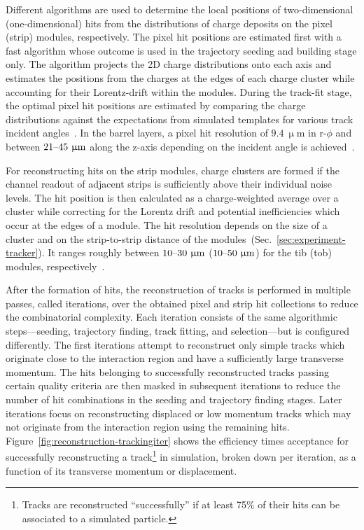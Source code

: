 Different algorithms are used to determine the local positions of two-dimensional (one-dimensional) hits from the distributions of charge deposits on the pixel (strip) modules, respectively. The pixel hit positions are estimated first with a fast algorithm whose outcome is used in the trajectory seeding and building stage only. The algorithm projects the 2D charge distributions onto each axis and estimates the positions from the charges at the edges of each charge cluster while accounting for their Lorentz-drift within the modules. During the track-fit stage, the optimal pixel hit positions are estimated by comparing the charge distributions against the expectations from simulated templates for various track incident angles~\cite{Swartz:2007zz}. In the barrel layers, a pixel hit resolution of $9.4~\upmu\mathrm{m}$ in $\mathrm{r}\mbox{-}\phi$ and between $21\text{--}45~\upmu\mathrm{m}$ along the z-axis depending on the incident angle is achieved~\cite{Chatrchyan:2014fea}. 

For reconstructing hits on the strip modules, charge clusters are formed if the channel readout of adjacent strips is sufficiently above their individual noise levels. The hit position is then calculated as a charge-weighted average over a cluster while correcting for the Lorentz drift and potential inefficiencies which occur at the edges of a module. The hit resolution depends on the size of a cluster and on the strip-to-strip distance of the modules~(Sec.~\ref{sec:experiment-tracker}). It ranges roughly between $10\text{--}30~\upmu\mathrm{m}$ ($10\text{--}50~\upmu\mathrm{m}$) for the \gls{tib} (\gls{tob}) modules, respectively~\cite{Chatrchyan:2014fea}.

After the formation of hits, the reconstruction of tracks is performed in multiple passes, called iterations, over the obtained pixel and strip hit collections to reduce the combinatorial complexity. Each iteration consists of the same algorithmic steps---seeding, trajectory finding, track fitting, and selection---but is configured differently. The first iterations attempt to reconstruct only simple tracks which originate close to the interaction region and have a sufficiently large transverse momentum. The hits belonging to successfully reconstructed tracks passing certain quality criteria are then masked in subsequent iterations to reduce the number of hit combinations in the seeding and trajectory finding stages. Later iterations focus on reconstructing displaced or low momentum tracks which may not originate from the interaction region using the remaining hits. Figure~\ref{fig:reconstruction-trackingiter} shows the efficiency times acceptance for successfully reconstructing a track\footnote{Tracks are reconstructed ``successfully'' if at least 75\% of their hits can be associated to a simulated particle.} in simulation, broken down per iteration, as a function of its transverse momentum or displacement.

